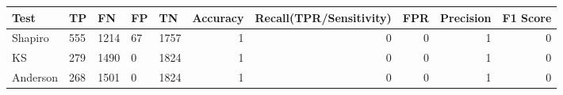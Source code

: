 \begin{tabular}{lllllrrrrr}
\toprule
Test & TP & FN & FP & TN & Accuracy & Recall(TPR/Sensitivity) & FPR & Precision & F1 Score \\
\midrule
Shapiro & 555 & 1214 & 67 & 1757 & 1 & 0 & 0 & 1 & 0 \\
KS & 279 & 1490 & 0 & 1824 & 1 & 0 & 0 & 1 & 0 \\
Anderson & 268 & 1501 & 0 & 1824 & 1 & 0 & 0 & 1 & 0 \\
\bottomrule
\end{tabular}
